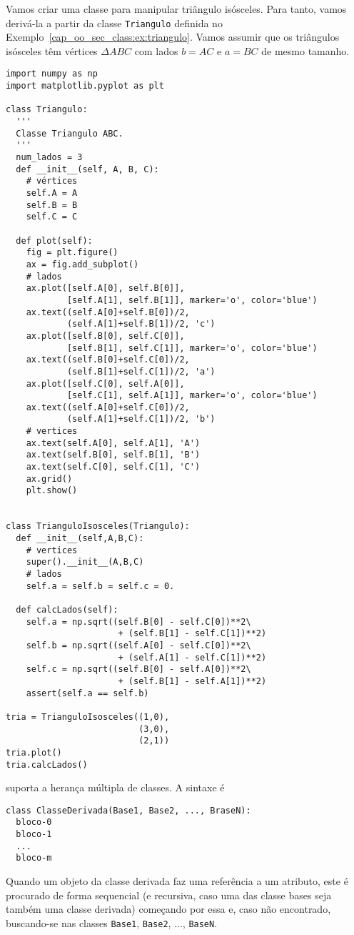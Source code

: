 \begin{ex}
  Vamos criar uma classe para manipular triângulo isósceles. Para tanto, vamos derivá-la a partir da classe \lstinline+Triangulo+ definida no Exemplo~\ref{cap_oo_sec_class:ex:triangulo}. Vamos assumir que os triângulos isósceles têm vértices $\Delta ABC$ com lados $b = AC$ e $a = BC$ de mesmo tamanho.

\begin{lstlisting}[caption=classTrianguloIsosceles.py, label=cap_oo_sec_her:cod:classTrianguloIsosceles]
import numpy as np
import matplotlib.pyplot as plt

class Triangulo:
  '''
  Classe Triangulo ABC.
  '''
  num_lados = 3
  def __init__(self, A, B, C):
    # vértices
    self.A = A
    self.B = B
    self.C = C

  def plot(self):
    fig = plt.figure()
    ax = fig.add_subplot()
    # lados
    ax.plot([self.A[0], self.B[0]],
            [self.A[1], self.B[1]], marker='o', color='blue')
    ax.text((self.A[0]+self.B[0])/2,
            (self.A[1]+self.B[1])/2, 'c')
    ax.plot([self.B[0], self.C[0]],
            [self.B[1], self.C[1]], marker='o', color='blue')
    ax.text((self.B[0]+self.C[0])/2,
            (self.B[1]+self.C[1])/2, 'a')
    ax.plot([self.C[0], self.A[0]],
            [self.C[1], self.A[1]], marker='o', color='blue')
    ax.text((self.A[0]+self.C[0])/2,
            (self.A[1]+self.C[1])/2, 'b')
    # vertices
    ax.text(self.A[0], self.A[1], 'A')
    ax.text(self.B[0], self.B[1], 'B')
    ax.text(self.C[0], self.C[1], 'C')
    ax.grid()
    plt.show()


class TrianguloIsosceles(Triangulo):
  def __init__(self,A,B,C):
    # vertices
    super().__init__(A,B,C)
    # lados
    self.a = self.b = self.c = 0.

  def calcLados(self):
    self.a = np.sqrt((self.B[0] - self.C[0])**2\
                      + (self.B[1] - self.C[1])**2)
    self.b = np.sqrt((self.A[0] - self.C[0])**2\
                      + (self.A[1] - self.C[1])**2)
    self.c = np.sqrt((self.B[0] - self.A[0])**2\
                      + (self.B[1] - self.A[1])**2)
    assert(self.a == self.b)

tria = TrianguloIsosceles((1,0),
                          (3,0),
                          (2,1))
tria.plot()
tria.calcLados()
\end{lstlisting}

\end{ex}

\begin{obs}
  {\python} suporta a herança múltipla de classes. A sintaxe é

\begin{lstlisting}
class ClasseDerivada(Base1, Base2, ..., BraseN):
  bloco-0
  bloco-1
  ...
  bloco-m
\end{lstlisting}
  
Quando um objeto da classe derivada faz uma referência a um atributo, este é procurado de forma sequencial (e recursiva, caso uma das classe bases seja também uma classe derivada) começando por essa e, caso não encontrado, buscando-se nas classes \lstinline+Base1+, \lstinline+Base2+, ..., \lstinline+BaseN+.
\end{obs}

